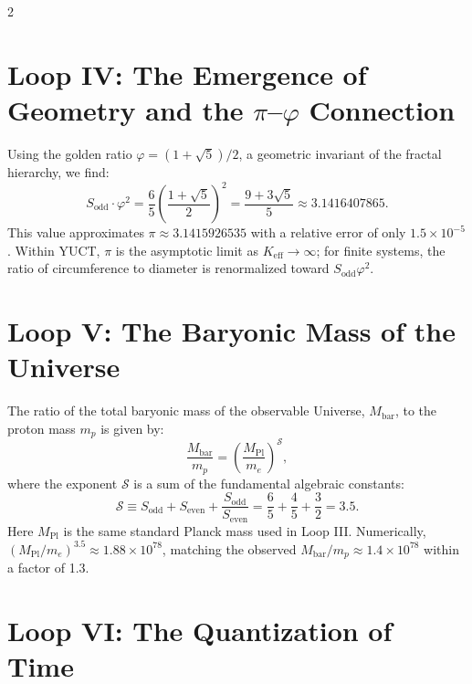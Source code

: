 \documentclass[12pt,a4paper]{article}
\newcommand{\Keff}{K_{\mathrm{eff}}}
\begin{document}
	\begin{multicols}{2}
		\section{Loop IV: The Emergence of Geometry and the \(\pi\)–\(\varphi\) Connection}
		
		Using the golden ratio \(\varphi = (1+\sqrt{5})/2\), a geometric invariant of the fractal hierarchy, we find:
		\begin{equation}
			S_{\mathrm{odd}} \cdot \varphi^2 = \frac{6}{5} \left( \frac{1+\sqrt{5}}{2} \right)^2 = \frac{9+3\sqrt{5}}{5} \approx 3.1416407865.
		\end{equation}
		This value approximates \(\pi \approx 3.1415926535\) with a relative error of only \(1.5 \times 10^{-5}\). Within YUCT, \(\pi\) is the asymptotic limit as \(\Keff \to \infty\); for finite systems, the ratio of circumference to diameter is renormalized toward \(S_{\mathrm{odd}}\varphi^2\).
		
		\section{Loop V: The Baryonic Mass of the Universe}
		
		The ratio of the total baryonic mass of the observable Universe, \(M_{\mathrm{bar}}\), to the proton mass \(m_p\) is given by:
		\begin{equation}
			\frac{M_{\mathrm{bar}}}{m_p} = \left( \frac{M_{\mathrm{Pl}}}{m_e} \right)^{\mathcal{S}},
		\end{equation}
		where the exponent \(\mathcal{S}\) is a sum of the fundamental algebraic constants:
		\begin{equation}
			\mathcal{S} \equiv S_{\mathrm{odd}} + S_{\mathrm{even}} + \frac{S_{\mathrm{odd}}}{S_{\mathrm{even}}} = \frac{6}{5} + \frac{4}{5} + \frac{3}{2} = 3.5.
		\end{equation}
		Here \(M_{\mathrm{Pl}}\) is the same standard Planck mass used in Loop III. Numerically, \((M_{\mathrm{Pl}}/m_e)^{3.5} \approx 1.88 \times 10^{78}\), matching the observed \(M_{\mathrm{bar}}/m_p \approx 1.4 \times 10^{78}\) within a factor of 1.3.
		
		\section{Loop VI: The Quantization of Time}
		

\end{multicols}
\end{document}
